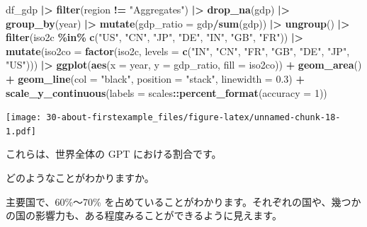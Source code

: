 \documentclass[
  xelatex, ja=standard]{bxjsbook}
\newenvironment{Shaded}{\begin{snugshade}}{\end{snugshade}}
\newcommand{\AttributeTok}[1]{\textcolor[rgb]{0.13,0.29,0.53}{#1}}
\newcommand{\DecValTok}[1]{\textcolor[rgb]{0.00,0.00,0.81}{#1}}
\newcommand{\FloatTok}[1]{\textcolor[rgb]{0.00,0.00,0.81}{#1}}
\newcommand{\FunctionTok}[1]{\textcolor[rgb]{0.13,0.29,0.53}{\textbf{#1}}}
\newcommand{\NormalTok}[1]{#1}
\newcommand{\SpecialCharTok}[1]{\textcolor[rgb]{0.81,0.36,0.00}{\textbf{#1}}}
\newcommand{\StringTok}[1]{\textcolor[rgb]{0.31,0.60,0.02}{#1}}
\theoremstyle{definition}
\theoremstyle{definition}
\theoremstyle{definition}
\theoremstyle{definition}
\theoremstyle{remark}
\begin{document}
\begin{Shaded}
\begin{Highlighting}[]
\NormalTok{df\_gdp }\SpecialCharTok{|\textgreater{}} 
  \FunctionTok{filter}\NormalTok{(region }\SpecialCharTok{!=} \StringTok{"Aggregates"}\NormalTok{) }\SpecialCharTok{|\textgreater{}} \FunctionTok{drop\_na}\NormalTok{(gdp) }\SpecialCharTok{|\textgreater{}} 
  \FunctionTok{group\_by}\NormalTok{(year) }\SpecialCharTok{|\textgreater{}} \FunctionTok{mutate}\NormalTok{(}\AttributeTok{gdp\_ratio =}\NormalTok{ gdp}\SpecialCharTok{/}\FunctionTok{sum}\NormalTok{(gdp)) }\SpecialCharTok{|\textgreater{}} \FunctionTok{ungroup}\NormalTok{() }\SpecialCharTok{|\textgreater{}}
  \FunctionTok{filter}\NormalTok{(iso2c }\SpecialCharTok{\%in\%} \FunctionTok{c}\NormalTok{(}\StringTok{"US"}\NormalTok{, }\StringTok{"CN"}\NormalTok{, }\StringTok{"JP"}\NormalTok{, }\StringTok{"DE"}\NormalTok{, }\StringTok{"IN"}\NormalTok{, }\StringTok{"GB"}\NormalTok{, }\StringTok{"FR"}\NormalTok{))  }\SpecialCharTok{|\textgreater{}}
  \FunctionTok{mutate}\NormalTok{(}\AttributeTok{iso2co =} \FunctionTok{factor}\NormalTok{(iso2c, }\AttributeTok{levels =} \FunctionTok{c}\NormalTok{(}\StringTok{"IN"}\NormalTok{, }\StringTok{"CN"}\NormalTok{, }\StringTok{"FR"}\NormalTok{, }\StringTok{"GB"}\NormalTok{, }\StringTok{"DE"}\NormalTok{, }\StringTok{"JP"}\NormalTok{, }\StringTok{"US"}\NormalTok{))) }\SpecialCharTok{|\textgreater{}}
  \FunctionTok{ggplot}\NormalTok{(}\FunctionTok{aes}\NormalTok{(}\AttributeTok{x =}\NormalTok{ year, }\AttributeTok{y =}\NormalTok{ gdp\_ratio, }\AttributeTok{fill =}\NormalTok{ iso2co)) }\SpecialCharTok{+} \FunctionTok{geom\_area}\NormalTok{() }\SpecialCharTok{+}
  \FunctionTok{geom\_line}\NormalTok{(}\AttributeTok{col =} \StringTok{"black"}\NormalTok{, }\AttributeTok{position =} \StringTok{"stack"}\NormalTok{, }\AttributeTok{linewidth =} \FloatTok{0.3}\NormalTok{) }\SpecialCharTok{+} 
  \FunctionTok{scale\_y\_continuous}\NormalTok{(}\AttributeTok{labels =}\NormalTok{ scales}\SpecialCharTok{::}\FunctionTok{percent\_format}\NormalTok{(}\AttributeTok{accuracy =} \DecValTok{1}\NormalTok{))}
\end{Highlighting}
\end{Shaded}

\texttt{[image: 30-about-firstexample\_files/figure-latex/unnamed-chunk-18-1.pdf]}

これらは、世界全体の GPT における割合です。

どのようなことがわかりますか。

主要国で、60\%〜70\% を占めていることがわかります。それぞれの国や、幾つかの国の影響力も、ある程度みることができるように見えます。
\end{document}
